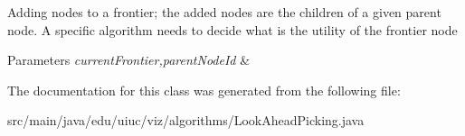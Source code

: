 Adding nodes to a frontier; the added nodes are the children of a given parent node. A specific algorithm needs to decide what is the utility of the frontier node


\begin{DoxyParams}{Parameters}
{\em current\+Frontier,parent\+Node\+Id} & \\
\hline
\end{DoxyParams}


The documentation for this class was generated from the following file\+:\begin{DoxyCompactItemize}
\item 
src/main/java/edu/uiuc/viz/algorithms/Look\+Ahead\+Picking.\+java\end{DoxyCompactItemize}
